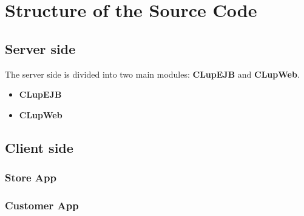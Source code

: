 \chapter{Structure of the Source Code}

\section{Server side}
The server side is divided into two main modules: \textbf{CLupEJB} and \textbf{CLupWeb}.
\begin{itemize}
	\item \textbf{CLupEJB}
	
	\item \textbf{CLupWeb}
\end{itemize}

\section{Client side}

\subsection{Store App}

\subsection{Customer App}